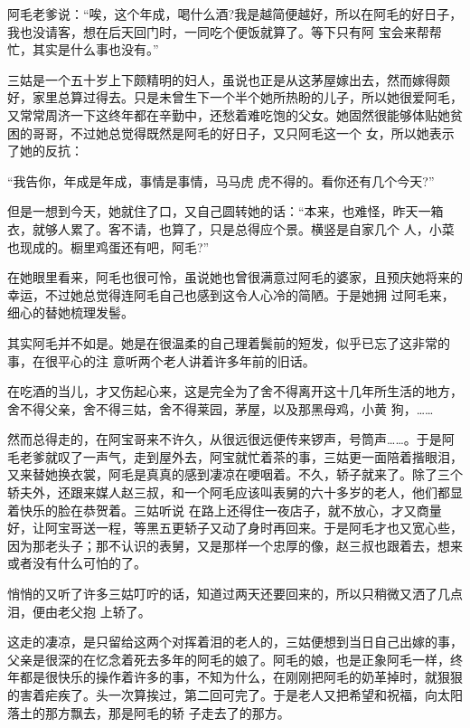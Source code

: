 \documentclass{article}
\begin{document}
\newpage

阿毛老爹说：“唉，这个年成，喝什么酒?我是越简便越好，所以在阿毛的好日子，我也没请客，想在后天回门时，一同吃个便饭就算了。等下只有阿
宝会来帮帮忙，其实是什么事也没有。” 

三姑是一个五十岁上下颇精明的妇人，虽说也正是从这茅屋嫁出去，然而嫁得颇好，家里总算过得去。只是未曾生下一个半个她所热盼的儿子，所以她很爱阿毛，又常常周济一下这终年都在辛勤中，还愁着难吃饱的父女。她固然很能够体贴她贫困的哥哥，不过她总觉得既然是阿毛的好日子，又只阿毛这一个
女，所以她表示了她的反抗： 

“我告你，年成是年成，事情是事情，马马虎
虎不得的。看你还有几个今天?” 

但是一想到今天，她就住了口，又自己圆转她的话：“本来，也难怪，昨天一箱衣，就够人累了。客不请，也算了，只是总得应个景。横竖是自家几个
人，小菜也现成的。橱里鸡蛋还有吧，阿毛?” 

\newpage

在她眼里看来，阿毛也很可怜，虽说她也曾很满意过阿毛的婆家，且预庆她将来的幸运，不过她总觉得连阿毛自己也感到这令人心冷的简陋。于是她拥
过阿毛来，细心的替她梳理发髻。 

其实阿毛并不如是。她是在很温柔的自己理着鬓前的短发，似乎已忘了这非常的事，在很平心的注
意听两个老人讲着许多年前的旧话。 

在吃酒的当儿，才又伤起心来，这是完全为了舍不得离开这十几年所生活的地方，舍不得父亲，舍不得三姑，舍不得莱园，茅屋，以及那黑母鸡，小黄
狗，…… 

然而总得走的，在阿宝哥来不许久，从很远很远便传来锣声，号筒声……。于是阿毛老爹就叹了一声气，走到屋外去，阿宝就忙着茶的事，三姑更一面陪着揩眼泪，又来替她换衣裳，阿毛是真真的感到凄凉在哽咽着。不久，轿子就来了。除了三个轿夫外，还跟来媒人赵三叔，和一个阿毛应该叫表舅的六十多岁的老人，他们都显着快乐的脸在恭贺着。三姑听说
\newpage
在路上还得住一夜店子，就不放心，才又商量好，让阿宝哥送一程，等黑五更轿子又动了身时再回来。于是阿毛才也又宽心些，因为那老头子；那不认识的表舅，又是那样一个忠厚的像，赵三叔也跟着去，想来
或者没有什么可怕的了。 

悄悄的又听了许多三姑叮咛的话，知道过两天还要回来的，所以只稍微又洒了几点泪，便由老父抱
上轿了。 

这走的凄凉，是只留给这两个对挥着泪的老人的，三姑便想到当日自己出嫁的事，父亲是很深的在忆念着死去多年的阿毛的娘了。阿毛的娘，也是正象阿毛一样，终年都是很快乐的操作着许多的事，不知为什么，在刚刚把阿毛的奶革掉时，就狠狠的害着疟疾了。头一次算挨过，第二回可完了。于是老人又把希望和祝福，向太阳落土的那方飘去，那是阿毛的轿
子走去了的那方。 
\end{document}

